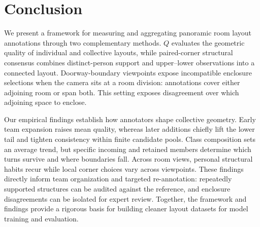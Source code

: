 \section{Conclusion}

We present a framework for measuring and aggregating panoramic room layout annotations through two complementary methods. $Q$ evaluates the geometric quality of individual and collective layouts, while paired-corner structural consensus combines distinct-person support and upper--lower observations into a connected layout. Doorway-boundary viewpoints expose incompatible enclosure selections when the camera sits at a room division: annotations cover either adjoining room or span both. This setting exposes disagreement over which adjoining space to enclose.

Our empirical findings establish how annotators shape collective geometry. Early team expansion raises mean quality, whereas later additions chiefly lift the lower tail and tighten consistency within finite candidate pools. Class composition sets an average trend, but specific incoming and retained members determine which turns survive and where boundaries fall. Across room views, personal structural habits recur while local corner choices vary across viewpoints. These findings directly inform team organization and targeted re-annotation: repeatedly supported structures can be audited against the reference, and enclosure disagreements can be isolated for expert review. Together, the framework and findings provide a rigorous basis for building cleaner layout datasets for model training and evaluation.
